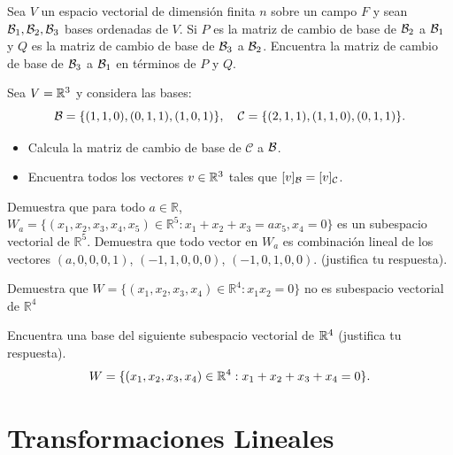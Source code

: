 \documentclass[12pt,a4paper]{book}
\newcommand{\llaves}[1]{\{#1\}}
\begin{document}
    \begin{ejercicio}
        Sea $V$ un espacio vectorial de dimensión finita $n$ sobre un campo $F$ y sean $\mathcal{B}_1, \mathcal{B}_2, \mathcal{B}_3$ bases ordenadas de $V$. Si $P$ es la matriz de cambio de base de $\mathcal{B}_2$ a $\mathcal{B}_1$ y $Q$ es la matriz de cambio de base de $\mathcal{B}_3$ a $\mathcal{B}_2$. Encuentra la matriz de cambio de base de $\mathcal{B}_3$ a $\mathcal{B}_1$ en términos de $P$ y $Q$.
    \end{ejercicio}

    \begin{ejercicio}
        Sea $V = \mathbb{R}^3$ y considera las bases:
        \[
        \BB = \llaves{(1, 1, 0), (0, 1, 1), (1, 0, 1)}, \quad \mathcal{C} = \llaves{(2, 1, 1), (1, 1, 0), (0, 1, 1)}.
        \]
        \begin{itemize}
            \item[(a)] Calcula la matriz de cambio de base de $\mathcal{C}$ a $\mathcal{B}$.
            \item[(b)] Encuentra todos los vectores $v \in \mathbb{R}^3$ tales que $[v]_{\mathcal{B}} = [v]_\mathcal{C}$.
        \end{itemize}
    \end{ejercicio}

    \begin{ejercicio}
        Demuestra que para todo $a\in\mathbb{R}$, $W_{a}=\{(x_{1},x_{2},x_{3},x_{4},x_{5})\in\mathbb{R}^{5}:x_{1}+x_{2}+x_{3}=ax_{5},x_{4}=0\}$
        es un subespacio vectorial de $\mathbb{R}^{5}$. Demuestra que todo
        vector en $W_{a}$ es combinación lineal de los vectores $(a,0,0,0,1)$,
        $(-1,1,0,0,0)$, $(-1,0,1,0,0)$. (justifica tu respuesta).
    \end{ejercicio}

    \begin{ejercicio}
        Demuestra que $W=\{(x_{1},x_{2},x_{3},x_{4})\in\mathbb{R}^{4}:x_{1}x_{2}=0\}$
        no es subespacio vectorial de $\mathbb{R}^{4}$
    \end{ejercicio}

    \begin{ejercicio}
        Encuentra una base del siguiente subespacio vectorial de $\mathbb{R}^{4}$
        (justifica tu respuesta).
        \begin{equation*}
            W=\{(x_{1},x_{2},x_{3},x_{4})\in\mathbb{R}^{4}:x_{1}+x_{2}+x_{3}+x_{4}=0\}.
        \end{equation*}
    \end{ejercicio}
    
    \chapter{Transformaciones Lineales}
\end{document}
